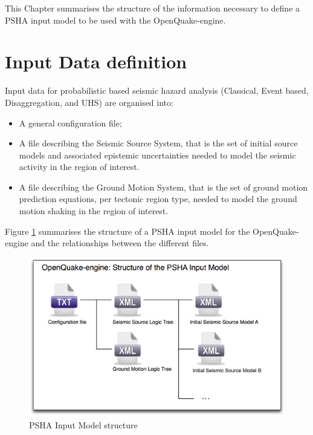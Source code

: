 This Chapter summarises the structure of the information necessary 
to define a PSHA input model to be used with the OpenQuake-engine.
\section{Input Data definition}
\label{sec:hazInputData}
Input data for probabilistic based seismic hazard analysis (Classical, 
Event based, Disaggregation, and UHS) are organised into:
\begin{itemize}
\item A general configuration file;
\item A file describing the Seismic Source System, that is the set of 
    initial source models and associated epistemic uncertainties needed 
    to model the seismic activity in the region of interest.
\item A file describing the Ground Motion System, that is the set of ground 
    motion prediction equations, per tectonic region type, needed to model 
    the ground motion shaking in the region of interest.
\end{itemize}
%
Figure \ref{fig:psha_input} summarises the structure of a PSHA input model
for the OpenQuake-engine and the relationships between the different files.
\begin{figure}[!ht]
\centering
\includegraphics[width=14cm]{./figures/hazard/psha_input_structure.eps}
\caption{PSHA Input Model structure}
\label{fig:psha_input}
\end{figure}
